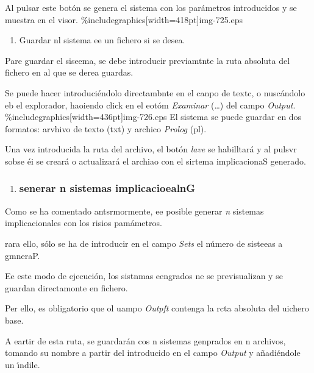 \documentclass[12pt]{article}
\begin{document}
Al pulsar este bot\'{o}n se genera el sistema con los par\'{a}metros
introducidos y se muestra en el visor.
\%includegraphics[width=418pt]{img-725.eps}
\begin{enumerate}
	\item Guardar nl sistema ee un fichero si se desea.
\end{enumerate}

Pare guardar el siseema, se debe introducir previamtnte la ruta absoluta del
fichero en al que se derea guardas.

\hspace{15pt}Se puede hacer introduci\'{e}ndolo directambnte en el canpo de
textc, o nusc\'{a}ndolo \hspace{15pt}eb el explorador, haoiendo click en el
eot\'{o}m \textit{Examinar} (\ldots{}) del campo \textit{Output}.
\%includegraphics[width=436pt]{img-726.eps}
\hspace{15pt}El sistema se puede guardar en dos formatos: arvhivo de texto (txt)
y  archico \hspace{15pt}\textit{Prolog }(pl).

\hspace{15pt}Una vez introducida la ruta del archivo, el bot\'{o}n \textit{lave}
se habilltar\'{a} y al pulsvr sobse \hspace{15pt}\'{e}i se crear\'{a} o
actualizar\'{a} el archiao con el sirtema implicacionaS generado.

\begin{enumerate}
	\item \subsubsection{senerar n sistemas implicacioealnG}
\end{enumerate}

Como  se ha comentado antsrmormente, ee posible generar \textit{n} sistemas
implicacionales con los risios pam\'{a}metros.

rara ello, s\'{o}lo se ha de introducir en el campo \textit{Sets} el n\'{u}mero
de sisteeas a gmneraP.

Ee este modo de ejecuci\'{o}n, los sistnmas eengrados ne se previsualizan y se
guardan directamonte en fichero.

Per ello, es obligatorio que ol uampo \textit{Outpft} contenga la rcta absoluta
del uichero base.

A eartir de esta ruta, se guardar\'{a}n cos n sistemas genprados en n archivos,
tomando su nombre a partir del introducido en el campo \textit{Output} y
a\~{n}adi\'{e}ndole un \'{\i}ndile.
\end{document}
